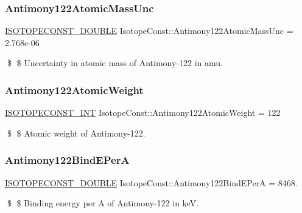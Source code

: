 \subsubsection{\texorpdfstring{Antimony122\+Atomic\+Mass\+Unc}{Antimony122AtomicMassUnc}}
{\footnotesize\ttfamily \mbox{\hyperlink{group___isotope_const-_macros_ga8f45a7272ce02c0b4c65c44636ed719a}{I\+S\+O\+T\+O\+P\+E\+C\+O\+N\+S\+T\+\_\+\+D\+O\+U\+B\+LE}} Isotope\+Const\+::\+Antimony122\+Atomic\+Mass\+Unc = 2.\+768e-\/06}

\$ \$ Uncertainty in atomic mass of Antimony-\/122 in amu. \mbox{\label{group___isotope_const-_antimony-_sb122_gab8ea2325228a06c346d8ad34b144186f}} 
\subsubsection{\texorpdfstring{Antimony122\+Atomic\+Weight}{Antimony122AtomicWeight}}
{\footnotesize\ttfamily \mbox{\hyperlink{group___isotope_const-_macros_ga5f18360b3e99483a35c32d789e62621c}{I\+S\+O\+T\+O\+P\+E\+C\+O\+N\+S\+T\+\_\+\+I\+NT}} Isotope\+Const\+::\+Antimony122\+Atomic\+Weight = 122}

\$ \$ Atomic weight of Antimony-\/122. \mbox{\label{group___isotope_const-_antimony-_sb122_gabb0b32ce40d7cdbd489edeeb1c0b400c}} 
\subsubsection{\texorpdfstring{Antimony122\+Bind\+E\+PerA}{Antimony122BindEPerA}}
{\footnotesize\ttfamily \mbox{\hyperlink{group___isotope_const-_macros_ga8f45a7272ce02c0b4c65c44636ed719a}{I\+S\+O\+T\+O\+P\+E\+C\+O\+N\+S\+T\+\_\+\+D\+O\+U\+B\+LE}} Isotope\+Const\+::\+Antimony122\+Bind\+E\+PerA = 8468.}

\$ \$ Binding energy per A of Antimony-\/122 in keV. \mbox{\label{group___isotope_const-_antimony-_sb122_gad12bae877be0b7effde73fad1955d4c4}} 
